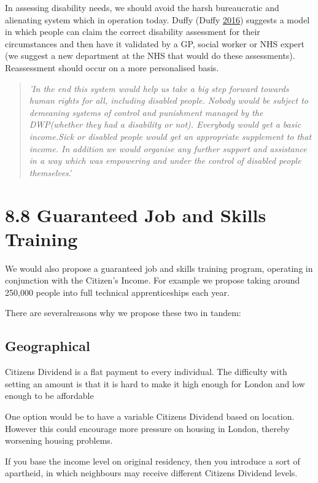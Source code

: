 \documentclass[]{tufte-handout}
\begin{document}
In assessing disability needs, we should avoid the harsh bureaucratic
and alienating system which in operation today. Duffy (Duffy
\protect\hyperlink{ref-Duffy}{2016}) suggests a model in which people
can claim the correct disability assessment for their circumstances and
then have it validated by a GP, social worker or NHS expert (we suggest
a new department at the NHS that would do these assessments).
Reassessment should occur on a more personalised basis.

\begin{quote}
\emph{'In the end this system would help us take a big step forward
towards human rights for all, including disabled people. Nobody would be
subject to demeaning systems of control and punishment managed by the
DWP(whether they had a disability or not). Everybody would get a basic
income.Sick or disabled people would get an appropriate supplement to
that income. In addition we would organise any further support and
assistance in a way which was empowering and under the control of
disabled people themselves}.'
\end{quote}

\hypertarget{guaranteed-job-and-skills-training}{%
\section{8.8 Guaranteed Job and Skills
Training}\label{guaranteed-job-and-skills-training}}

We would also propose a guaranteed job and skills training program,
operating in conjunction with the Citizen's Income. For example we
propose taking around 250,000 people into full technical apprenticeships
each year.

There are severalreasons why we propose these two in tandem:

\hypertarget{geographical}{%
\subsection{Geographical}\label{geographical}}

Citizens Dividend is a flat payment to every individual. The difficulty
with setting an amount is that it is hard to make it high enough for
London and low enough to be affordable

One option would be to have a variable Citizens Dividend based on
location. However this could encourage more pressure on housing in
London, thereby worsening housing problems.

If you base the income level on original residency, then you introduce a
sort of apartheid, in which neighbours may receive different Citizens
Dividend levels.
\end{document}
